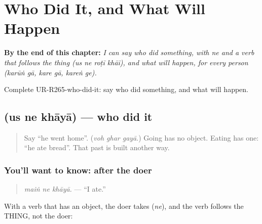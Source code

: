
\chapter{Who Did It, and What Will Happen}
\label{ch:ur-who-did-it-and-what-will-happen}

\begin{chapteropening}
\textbf{By the end of this chapter:} \emph{I can say who did something, with ne and a verb that follows the thing (us ne roṭī khāī), and what will happen, for every person (karūṅ gā, kare gā, kareṅ ge).}

Complete UR-R265-who-did-it: say who did something, and what will happen.
\end{chapteropening}

\section[\texorpdfstring{\ur{اس} \ur{نے} \ur{کھایا} (us ne khāyā)}{اس نے کھایا (us ne khāyā)}]{   (us ne khāyā) — who did it}

\label{lesson:UR-C265-us-ne-khaya}



\begin{quote}
Say \textquotedblleft{}he went home\textquotedblright{}. (\emph{voh ghar gayā}.) Going has no object. Eating has one: \textquotedblleft{}he ate bread\textquotedblright{}. That past is built another way.
\end{quote}

\subsection*{You'll want to know:  after the doer}
\begin{quote}
\textbf{  }
\end{quote}

\begin{quote}
\emph{maiṅ ne khāyā.} — \textquotedblleft{}I ate.\textquotedblright{}
\end{quote}

With a verb that has an object, the doer takes \textbf{} (\emph{ne}), and the verb follows the THING, not the doer:

